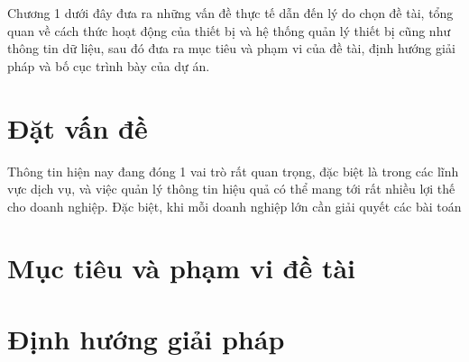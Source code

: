 \documentclass[../DoAn.tex]{subfiles}
\begin{document}
Chương 1 dưới đây đưa ra những vấn đề thực tế dẫn đến lý do chọn đề tài, tổng quan về cách thức hoạt động của thiết bị và hệ thống quản lý thiết bị cũng như thông tin dữ liệu, sau đó đưa ra mục tiêu và phạm vi của đề tài, định hướng giải pháp và bố cục trình bày của dự án.

\section{Đặt vấn đề}
\label{section:1.1}
Thông tin hiện nay đang đóng 1 vai trò rất quan trọng, đặc biệt là trong các lĩnh vực dịch vụ, và việc quản lý thông tin hiệu quả có thể mang tới rất nhiều lợi thế cho doanh nghiệp. Đặc biệt, khi mỗi doanh nghiệp lớn cần giải quyết các bài toán 


\section{Mục tiêu và phạm vi đề tài}
\label{section:1.2}



\section{Định hướng giải pháp}
\label{section:1.3}
\end{document}

